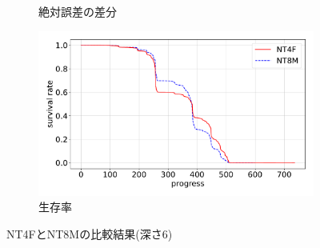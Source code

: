 \begin{figure}[t]
\begin{subfigure}[b]{0.49\linewidth}
    \caption{絶対誤差の差分}
    \label{fig:EXP6_NT4F_and_NT8M_error_abs_diff}
\end{subfigure}
\begin{subfigure}[b]{0.49\linewidth}
    \includegraphics[width=\linewidth]{pdf/compare/EXP6_NT4F_and_NT8M/survival.pdf}
    \caption{生存率}
    \label{figEXP6_:NT4F_and_NT8M_survival}
\end{subfigure}
\caption{NT4FとNT8Mの比較結果(深さ6)}
\label{fig:EXP6_NT4FとNT8M_results}
\end{figure}
    

